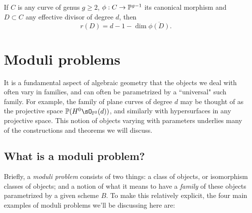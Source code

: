 \begin{theorem}\label{geometric RR}
If $C$ is any curve of genus $g \geq 2$,  $\phi : C \to \PP^{g-1}$ its canonical morphism and $D \subset C$ any effective divisor of degree $d$, then
$$
r(D) = d - 1 - \dim \overline{\phi(D)}.
$$
\end{theorem}

 

\section{Moduli problems}

It is a fundamental aspect of algebraic geometry that the objects we deal with often vary in families, and can often be parametrized by a ``universal" such family. For example, the family of plane curves of degree $d$ may be thought of as the projective
space $\PP(H^{0} \sO_{\PP^{2}}(d))$, and similarly with hypersurfaces in any projective space. This notion of objects varying with parameters underlies many of the constructions and theorems we will discuss. 

\subsection{What is a moduli problem?}

Briefly, a \emph{moduli problem} consists of two things: a class of objects, or isomorphism classes of objects; and a notion of what it means to have a \emph{family} of these objects parametrized by a given scheme $B$. To make this relatively explicit, the four main examples of moduli problems we'll be discussing here are:


